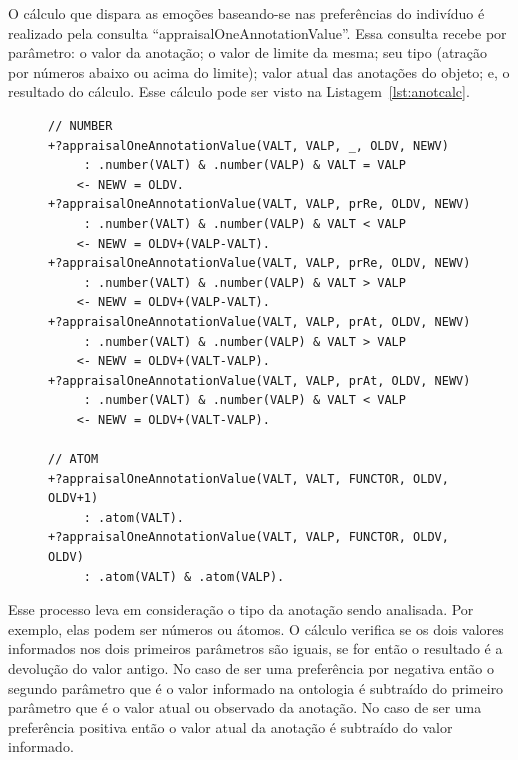 O cálculo que dispara as emoções baseando-se nas preferências do indivíduo é
realizado pela consulta ``appraisalOneAnnotationValue''. Essa consulta recebe
por parâmetro: o valor da anotação; o valor de limite da mesma; seu tipo
(atração por números abaixo ou acima do limite); valor atual das anotações do
objeto; e, o resultado do cálculo. Esse cálculo pode ser visto na
Listagem~\ref{lst:anotcalc}.

\begin{figure}
\begin{center}
    \begin{minipage}{130mm}
	\lstset{linewidth=130mm}
	\begin{lstlisting}[frame=trbl,
caption=Amostra de código referente ao cálculo de uma anotação.,
label=lst:anotcalc]
// NUMBER
+?appraisalOneAnnotationValue(VALT, VALP, _, OLDV, NEWV)
     : .number(VALT) & .number(VALP) & VALT = VALP
    <- NEWV = OLDV.
+?appraisalOneAnnotationValue(VALT, VALP, prRe, OLDV, NEWV)
     : .number(VALT) & .number(VALP) & VALT < VALP
    <- NEWV = OLDV+(VALP-VALT).
+?appraisalOneAnnotationValue(VALT, VALP, prRe, OLDV, NEWV)
     : .number(VALT) & .number(VALP) & VALT > VALP
    <- NEWV = OLDV+(VALP-VALT).
+?appraisalOneAnnotationValue(VALT, VALP, prAt, OLDV, NEWV)
     : .number(VALT) & .number(VALP) & VALT > VALP
    <- NEWV = OLDV+(VALT-VALP).
+?appraisalOneAnnotationValue(VALT, VALP, prAt, OLDV, NEWV)
     : .number(VALT) & .number(VALP) & VALT < VALP
    <- NEWV = OLDV+(VALT-VALP).

// ATOM
+?appraisalOneAnnotationValue(VALT, VALT, FUNCTOR, OLDV, OLDV+1)
     : .atom(VALT).
+?appraisalOneAnnotationValue(VALT, VALP, FUNCTOR, OLDV, OLDV)
     : .atom(VALT) & .atom(VALP).
	\end{lstlisting}
    \end{minipage}
\end{center}
\end{figure}

Esse processo leva em consideração o tipo da anotação sendo analisada. Por
exemplo, elas podem ser números ou átomos. O cálculo verifica se os dois
valores informados nos dois primeiros parâmetros são iguais, se for então o
resultado é a devolução do valor antigo. No caso de ser uma preferência por
negativa então o segundo parâmetro que é o valor informado na ontologia é
subtraído do primeiro parâmetro que é o valor atual ou observado da anotação.
No caso de ser uma preferência positiva então o valor atual da anotação é
subtraído do valor informado.

